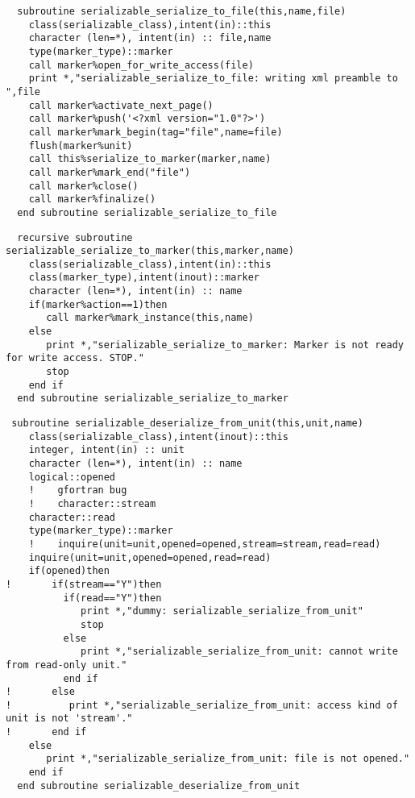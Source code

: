 \begin{Verbatim}
  subroutine serializable_serialize_to_file(this,name,file)
    class(serializable_class),intent(in)::this
    character (len=*), intent(in) :: file,name
    type(marker_type)::marker
    call marker%open_for_write_access(file)
    print *,"serializable_serialize_to_file: writing xml preamble to ",file
    call marker%activate_next_page()
    call marker%push('<?xml version="1.0"?>')
    call marker%mark_begin(tag="file",name=file)
    flush(marker%unit)
    call this%serialize_to_marker(marker,name)
    call marker%mark_end("file")
    call marker%close()
    call marker%finalize()
  end subroutine serializable_serialize_to_file
\end{Verbatim}

\begin{Verbatim}
  recursive subroutine serializable_serialize_to_marker(this,marker,name)
    class(serializable_class),intent(in)::this
    class(marker_type),intent(inout)::marker
    character (len=*), intent(in) :: name
    if(marker%action==1)then
       call marker%mark_instance(this,name)
    else       
       print *,"serializable_serialize_to_marker: Marker is not ready for write access. STOP."
       stop
    end if
  end subroutine serializable_serialize_to_marker
\end{Verbatim}

\begin{Verbatim}
 subroutine serializable_deserialize_from_unit(this,unit,name)
    class(serializable_class),intent(inout)::this
    integer, intent(in) :: unit
    character (len=*), intent(in) :: name
    logical::opened
    !    gfortran bug
    !    character::stream
    character::read
    type(marker_type)::marker
    !    inquire(unit=unit,opened=opened,stream=stream,read=read)
    inquire(unit=unit,opened=opened,read=read)
    if(opened)then
!       if(stream=="Y")then
          if(read=="Y")then
             print *,"dummy: serializable_serialize_from_unit"
             stop
          else
             print *,"serializable_serialize_from_unit: cannot write from read-only unit."
          end if
!       else
!          print *,"serializable_serialize_from_unit: access kind of unit is not 'stream'."
!       end if
    else
       print *,"serializable_serialize_from_unit: file is not opened."
    end if
  end subroutine serializable_deserialize_from_unit
\end{Verbatim}

